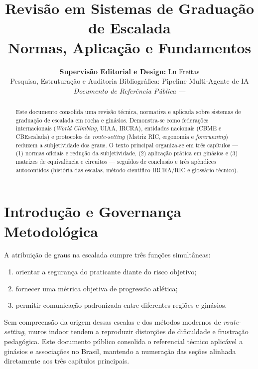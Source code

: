 \documentclass[11pt,a4paper]{article}
\title{\vspace{-1.6cm}\LARGE\textbf{\color{primary}Revisão em Sistemas de Graduação de Escalada}\\
\vspace{0.25cm}\Large\color{secondary}Normas, Aplicação e Fundamentos}
\author{\small\textbf{Supervisão Editorial e Design:} Lu Freitas\\
\footnotesize\color{secondary}Pesquisa, Estruturação e Auditoria Bibliográfica: Pipeline Multi-Agente de IA\\
\footnotesize\color{secondary}\textit{Documento de Referência Pública --- \docversion}}
\date{\small \docdate}
\begin{document}
\maketitle

\begin{abstract}
\noindent Este documento consolida uma revisão técnica, normativa e aplicada sobre sistemas de graduação de escalada em rocha e ginásios. Demonstra-se como federações internacionais (\textit{World Climbing}, UIAA, IRCRA), entidades nacionais (CBME e CBEscalada) e protocolos de \textit{route-setting} (Matriz RIC, ergonomia e \textit{forerunning}) reduzem a subjetividade dos graus. O texto principal organiza-se em três capítulos — (1) normas oficiais e redução da subjetividade, (2) aplicação prática em ginásios e (3) matrizes de equivalência e circuitos — seguidos de conclusão e três apêndices autocontidos (história das escalas, método científico IRCRA/RIC e glossário técnico).
\end{abstract}

\vspace{0.2cm}
\tableofcontents
\newpage

\section*{Introdução e Governança Metodológica}

A atribuição de graus na escalada cumpre três funções simultâneas:
\begin{enumerate}
    \item orientar a segurança do praticante diante do risco objetivo;
    \item fornecer uma métrica objetiva de progressão atlética;
    \item permitir comunicação padronizada entre diferentes regiões e ginásios.
\end{enumerate}
Sem compreensão da origem dessas escalas e dos métodos modernos de \textit{route-setting}, muros indoor tendem a reproduzir distorções de dificuldade e frustração pedagógica. Este documento público consolida o referencial técnico aplicável a ginásios e associações no Brasil, mantendo a numeração das seções alinhada diretamente aos três capítulos principais.
\end{document}
